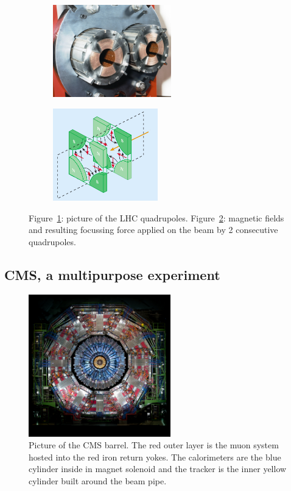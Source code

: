 	\begin{figure}[H]
		\begin{subfigure}{0.5\linewidth}
			\centering
			\includegraphics[height = 4cm]{fig/chapt2/LHC-quadrupole.jpg}
			\caption{\label{fig:LHCQuadrupole:A}}
		\end{subfigure}
		\begin{subfigure}{0.5\linewidth}
			\centering
			\includegraphics[height = 4cm]{fig/chapt2/LHC-quadrupole-field.png}
			\caption{\label{fig:LHCQuadrupole:B}}
		\end{subfigure}
		\caption{\label{fig:LHCQuadrupole} Figure~\ref{fig:LHCQuadrupole:A}: picture of the LHC quadrupoles. Figure~\ref{fig:LHCQuadrupole:B}: magnetic fields and resulting focussing force applied on the beam by 2 consecutive quadrupoles.}
	\end{figure}

	\subsection{CMS, a multipurpose experiment}
	\label{chapt2:ssec:CMS}
	
	\begin{figure}[H]
		\centering
		\includegraphics[width=0.55\textwidth]{fig/chapt2/CMS.jpg}
		\caption{\label{fig:CMS} Picture of the CMS barrel. The red outer layer is the muon system hosted into the red iron return yokes. The calorimeters are the blue cylinder inside in magnet solenoid and the tracker is the inner yellow cylinder built around the beam pipe.}
	\end{figure}
	
